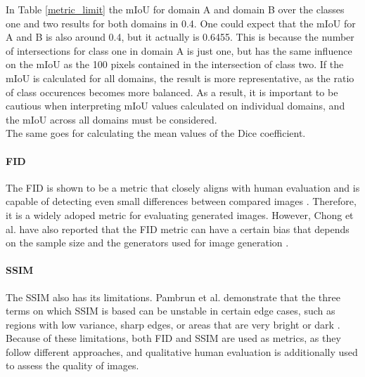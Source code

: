 In Table \ref{metric_limit} the mIoU for domain A and domain B over the classes one and two results for both domains in 0.4.
One could expect that the mIoU for A and B is also around 0.4, but it actually is 0.6455.
This is because the number of intersections for class one in domain A is just one, but has the same influence on the mIoU as the 100 pixels contained in the intersection of class two.  
If the mIoU is calculated for all domains, the result is more representative, as the ratio of class occurences becomes more balanced.
As a result, it is important to be cautious when interpreting mIoU values calculated on individual domains, and the mIoU across all domains must be considered.\\
The same goes for calculating the mean values of the Dice coefficient.
\paragraph*{FID} The FID is shown to be a metric that closely aligns with human evaluation and is capable of detecting even small differences between compared images \cite{borji2022pros}.
Therefore, it is a widely adoped metric for evaluating generated images.
However, Chong et al. have also reported that the FID metric can have a certain bias that depends on the sample size and the generators used for image generation \cite{chong2020effectively}.\\
\paragraph{SSIM} The SSIM also has its limitations.
Pambrun et al. demonstrate that the three terms on which SSIM is based can be unstable in certain edge cases, such as regions with low variance, sharp edges, or areas that are very bright or dark \cite{pambrun2015limitations}.
Because of these limitations, both FID and SSIM are used as metrics, as they follow different approaches, and qualitative human evaluation is additionally used to assess the quality of images.

